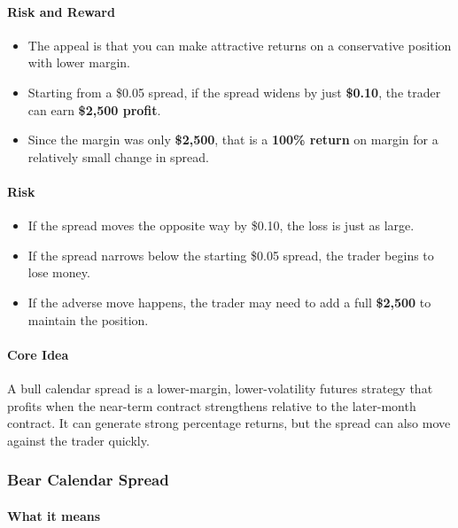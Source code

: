 \documentclass[12pt,openany]{book}
\begin{document}
\paragraph{Risk and Reward}

\begin{itemize}[leftmargin=*]
    \item The appeal is that you can make attractive returns on a conservative position with lower margin.
    \item Starting from a \$0.05 spread, if the spread widens by just \textbf{\$0.10}, the trader can earn \textbf{\$2,500 profit}.
    \item Since the margin was only \textbf{\$2,500}, that is a \textbf{100\% return} on margin for a relatively small change in spread.
\end{itemize}

\paragraph{Risk}

\begin{itemize}[leftmargin=*]
    \item If the spread moves the opposite way by \$0.10, the loss is just as large.
    \item If the spread narrows below the starting \$0.05 spread, the trader begins to lose money.
    \item If the adverse move happens, the trader may need to add a full \textbf{\$2,500} to maintain the position.
\end{itemize}

\paragraph{Core Idea}

A bull calendar spread is a lower-margin, lower-volatility futures strategy that profits when the near-term contract strengthens relative to the later-month contract. It can generate strong percentage returns, but the spread can also move against the trader quickly.

\subsubsection{Bear Calendar Spread}

\paragraph{What it means}
\end{document}
